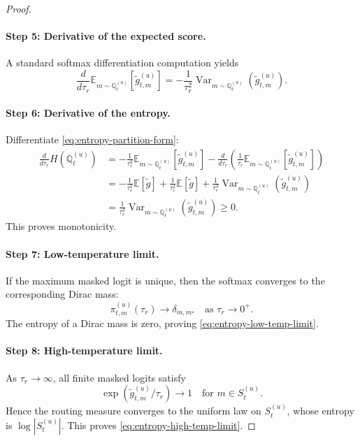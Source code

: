 \documentclass{article}
\theoremstyle{plain}
\theoremstyle{definition}
\theoremstyle{remark}
\begin{document}
\begin{proof}
\paragraph{Step 5: Derivative of the expected score.}
A standard softmax differentiation computation yields
\[
\frac{d}{d\tau_r}
\mathbb E_{m\sim \mathbb Q^{(u)}_{t}}[\tilde g^{(u)}_{t,m}]
=
-\frac{1}{\tau_r^2}
\operatorname{Var}_{m\sim \mathbb Q^{(u)}_{t}}(\tilde g^{(u)}_{t,m}).
\]

\paragraph{Step 6: Derivative of the entropy.}
Differentiate \eqref{eq:entropy-partition-form}:
\begin{align}
\frac{d}{d\tau_r}
 H\!\left(\mathbb{Q}^{(u)}_{t}\right)
&=
-\frac{1}{\tau_r^2}
\mathbb E_{m\sim \mathbb Q^{(u)}_{t}}[\tilde g^{(u)}_{t,m}]
-
\frac{d}{d\tau_r}
\left(
\frac{1}{\tau_r}
\mathbb E_{m\sim \mathbb Q^{(u)}_{t}}[\tilde g^{(u)}_{t,m}]
\right)
\\
&= 
-\frac{1}{\tau_r^2}\mathbb{E}[\tilde g]
+
\frac{1}{\tau_r^2}\mathbb{E}[\tilde g]
+
\frac{1}{\tau_r^3}
\operatorname{Var}_{m\sim \mathbb Q^{(u)}_{t}}(\tilde g^{(u)}_{t,m})
\\
&= 
\frac{1}{\tau_r^3}
\operatorname{Var}_{m\sim \mathbb Q^{(u)}_{t}}(\tilde g^{(u)}_{t,m})
\ge 0.
\end{align}
This proves monotonicity.

\paragraph{Step 7: Low-temperature limit.}
If the maximum masked logit is unique, then the softmax converges to the corresponding Dirac mass:
\[
\pi^{(u)}_{t,m}(\tau_r)\to \delta_{m,m^\star}
\quad\text{as } \tau_r\to 0^+.
\]
The entropy of a Dirac mass is zero, proving \eqref{eq:entropy-low-temp-limit}.

\paragraph{Step 8: High-temperature limit.}
As $\tau_r\to\infty$, all finite masked logits satisfy
\[
\exp(\tilde g^{(u)}_{t,m}/\tau_r)\to 1
\quad\text{for } m\in S_{t}^{(u)}.
\]
Hence the routing measure converges to the uniform law on $S_{t}^{(u)}$, whose entropy is $\log |S_{t}^{(u)}|$. This proves \eqref{eq:entropy-high-temp-limit}.
\end{proof}
\end{document}
